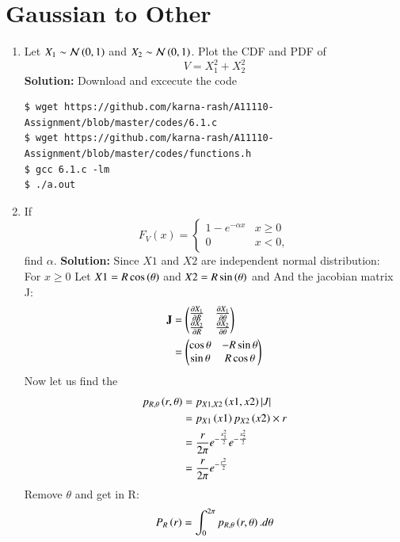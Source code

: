\documentclass[journal,12pt,twocolumn]{IEEEtran}
\renewcommand\thesection{\arabic{section}}
\begin{document}
\section{Gaussian to Other}
\begin{enumerate}[label=\thesection.\arabic*
,ref=\thesection.\theenumi]
\item
Let $X_1 \sim \mathcal{N}\left(0,1\right)$ and $X_2 \sim  \mathcal{N}\left(0,1\right)$. Plot the CDF and PDF of
%
\begin{equation}
V = X_1^2 + X_2^2
\end{equation}
%
%
%
\textbf{Solution:}
Download and excecute the code
	\begin{lstlisting}
$ wget https://github.com/karna-rash/A11110-Assignment/blob/master/codes/6.1.c
$ wget https://github.com/karna-rash/A11110-Assignment/blob/master/codes/functions.h
$ gcc 6.1.c -lm 
$ ./a.out 
	\end{lstlisting}
\item
If
%
\begin{equation}
F_{V}(x) = 
\begin{cases}
1 - e^{-\alpha x} & x \geq 0 \\
0 & x < 0,
\end{cases}
\end{equation}
%
find $\alpha$.
%
\textbf{Solution:}
Since $X1$ and $X2$ are independent normal distribution: \\
For $x \ge 0$
Let $X1=R\cos\left(\theta\right)$ and $X2=R\sin\left(\theta\right)$ and 
And the jacobian matrix J:
\begin{align}
\mathbf{J}&=\begin{pmatrix}\frac{\partial X_1}{\partial R}   & \frac{\partial X_1}{\partial \theta} \\
\frac{\partial X_2}{\partial R} & \frac{\partial X_2}{\partial \theta}\end{pmatrix} \\
&=\begin{pmatrix}\cos \theta  & -R\sin \theta \\ \sin \theta & R \cos \theta  \end{pmatrix}
\end{align}
Now let us find the 
\begin{align}
p_{R,\theta}\left(r,\theta\right)&=
p_{X1,X2}\left(x1,x2\right)\left\vert J\right\vert\\
&=p_{X1}\left(x1\right)p_{X2}\left(x2\right)\times r \\
&=\frac{r}{2\pi}e^{-\frac{x_1^2}{2}}e^{-\frac{x_2^2}{2}} \\
&=\frac{r}{2\pi}e^{-\frac{r^2}{2}}
\end{align}
Remove $\theta$ and get in R:
\begin{align}
P_R\brak{r}&=\int_{0}^{2\pi}p_{R,\theta}\brak{r,\theta}.d\theta \\

\end{align}
\end{enumerate}
\end{document}
